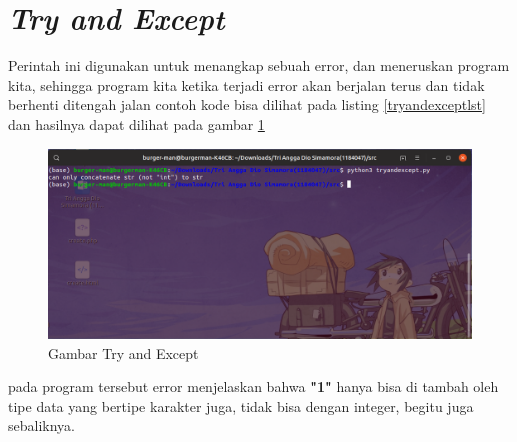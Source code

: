 \section{\textit{Try and Except}}
Perintah ini digunakan untuk menangkap sebuah error, dan meneruskan program kita, sehingga program kita ketika terjadi error akan berjalan terus dan tidak berhenti ditengah jalan contoh kode bisa dilihat pada listing \ref{tryandexceptlst} dan hasilnya dapat dilihat pada gambar \ref{tryandexceptgbr}



\begin{figure}[H]
\centering
\includegraphics[width=1\textwidth]{figures/tryandexcept.png}
\caption{Gambar Try and Except}
\label{tryandexceptgbr}
\end{figure}

pada program tersebut error menjelaskan bahwa \textbf{"1"} hanya bisa di tambah oleh tipe data yang bertipe karakter juga, tidak bisa dengan integer, begitu juga sebaliknya.